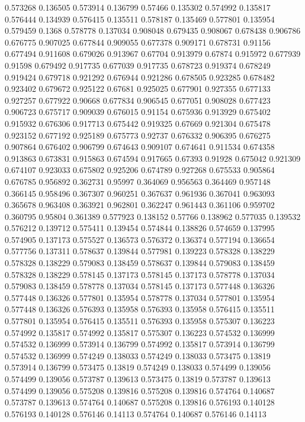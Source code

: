 0.573268 0.136505
0.573914 0.136799
0.57466 0.135302
0.574992 0.135817
0.576444 0.134939
0.576415 0.135511
0.578187 0.135469
0.577801 0.135954
0.579459 0.1368
0.578778 0.137034
0.908048 0.679435
0.908067 0.678438
0.906786 0.676775
0.907025 0.677844
0.909055 0.677378
0.909171 0.678731
0.91156 0.677494
0.911608 0.679026
0.913967 0.67704
0.913979 0.67874
0.915972 0.677939
0.91598 0.679492
0.917735 0.677039
0.917735 0.678723
0.919374 0.678249
0.919424 0.679718
0.921292 0.676944
0.921286 0.678505
0.923285 0.678482
0.923402 0.679672
0.925122 0.67681
0.925025 0.677901
0.927355 0.677133
0.927257 0.677922
0.90668 0.677834
0.906545 0.677051
0.908028 0.677423
0.906723 0.675717
0.909039 0.676015
0.91154 0.675936
0.913929 0.675402
0.915932 0.676306
0.917713 0.675442
0.919325 0.67669
0.921304 0.675478
0.923152 0.677192
0.925189 0.675773
0.92737 0.676332
0.906395 0.676275
0.907864 0.676402
0.906799 0.674643
0.909107 0.674641
0.911534 0.674358
0.913863 0.673831
0.915863 0.674594
0.917665 0.67393
0.91928 0.675042
0.921309 0.674107
0.923033 0.675802
0.925206 0.674789
0.927268 0.675533
0.905864 0.676785
0.956892 0.362731
0.95997 0.364069
0.956563 0.364469
0.957148 0.366145
0.958496 0.367307
0.960251 0.367637
0.961936 0.367041
0.963093 0.365678
0.963408 0.363921
0.962801 0.362247
0.961443 0.361106
0.959702 0.360795
0.95804 0.361389
0.577923 0.138152
0.57766 0.138962
0.577035 0.139532
0.576212 0.139712
0.575411 0.139454
0.574844 0.138826
0.574659 0.137995
0.574905 0.137173
0.575527 0.136573
0.576372 0.136374
0.577194 0.136654
0.577756 0.137311
0.578637 0.139844
0.577981 0.139223
0.578328 0.138229
0.578328 0.138229
0.579083 0.138459
0.578637 0.139844
0.579083 0.138459
0.578328 0.138229
0.578145 0.137173
0.578145 0.137173
0.578778 0.137034
0.579083 0.138459
0.578778 0.137034
0.578145 0.137173
0.577448 0.136326
0.577448 0.136326
0.577801 0.135954
0.578778 0.137034
0.577801 0.135954
0.577448 0.136326
0.576393 0.135958
0.576393 0.135958
0.576415 0.135511
0.577801 0.135954
0.576415 0.135511
0.576393 0.135958
0.575307 0.136223
0.574992 0.135817
0.574992 0.135817
0.575307 0.136223
0.574532 0.136999
0.574532 0.136999
0.573914 0.136799
0.574992 0.135817
0.573914 0.136799
0.574532 0.136999
0.574249 0.138033
0.574249 0.138033
0.573475 0.13819
0.573914 0.136799
0.573475 0.13819
0.574249 0.138033
0.574499 0.139056
0.574499 0.139056
0.573787 0.139613
0.573475 0.13819
0.573787 0.139613
0.574499 0.139056
0.575208 0.139816
0.575208 0.139816
0.574764 0.140687
0.573787 0.139613
0.574764 0.140687
0.575208 0.139816
0.576193 0.140128
0.576193 0.140128
0.576146 0.14113
0.574764 0.140687
0.576146 0.14113
